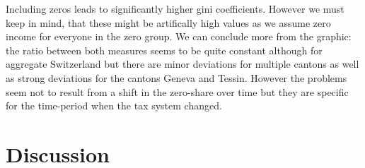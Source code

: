 \documentclass[twoside]{article}\usepackage[]{graphicx}\usepackage[]{color}
\newenvironment{knitrout}{}{} %
\begin{document}
\begin{multicols}{2}
\begin{knitrout}
\end{knitrout}


Including zeros leads to significantly higher gini coefficients. However we must keep in mind, that these might be artifically high values as we assume zero income for everyone in the zero group. We can conclude more from the graphic: the ratio between both measures seems to be quite constant although for aggregate Switzerland but there are minor deviations for multiple cantons as well as strong deviations for the cantons Geneva and Tessin. However the problems seem not to result from a shift in the zero-share over time but they are specific for the time-period when the tax system changed. 












\section{Discussion}


\end{multicols}
\end{document}
